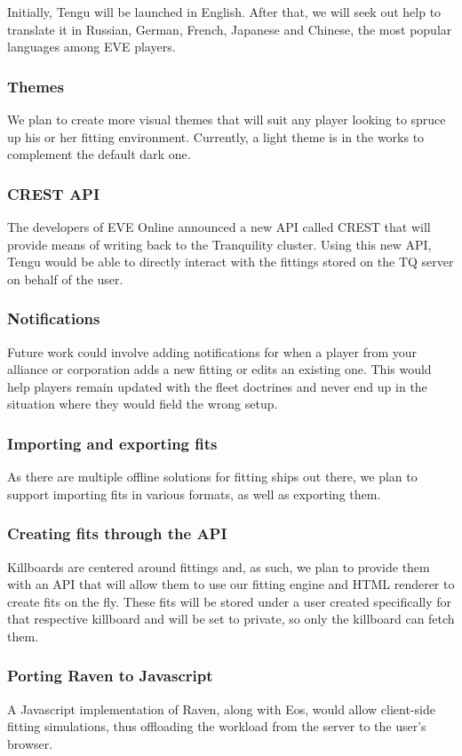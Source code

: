 Initially, Tengu will be launched in English. After that, we will seek out help to translate it in Russian, German, French, Japanese and Chinese, the most popular languages among EVE players.

\subsubsection{Themes}
We plan to create more visual themes that will suit any player looking to spruce up his or her fitting environment. Currently, a light theme is in the works to complement the default dark one.

\subsubsection{CREST API}
The developers of EVE Online announced a new API called CREST that will provide means of writing back to the Tranquility cluster. Using this new API, Tengu would be able to directly interact with the fittings stored on the TQ server on behalf of the user.

\subsubsection{Notifications}
Future work could involve adding notifications for when a player from your alliance or corporation adds a new fitting or edits an existing one. This would help players remain updated with the fleet doctrines and never end up in the situation where they would field the wrong setup.

\subsubsection{Importing and exporting fits}
As there are multiple offline solutions for fitting ships out there, we plan to support importing fits in various formats, as well as exporting them.

\subsubsection{Creating fits through the API}
Killboards are centered around fittings and, as such, we plan to provide them with an API that will allow them to use our fitting engine and HTML renderer to create fits on the fly. These fits will be stored under a user created specifically for that respective killboard and will be set to private, so only the killboard can fetch them.

\subsubsection{Porting Raven to Javascript}
A Javascript implementation of Raven, along with Eos, would allow client-side fitting simulations, thus offloading the workload from the server to the user’s browser.
